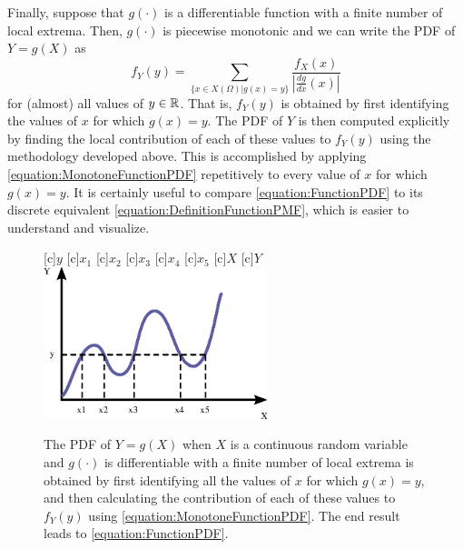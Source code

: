 Finally, suppose that $g(\cdot)$ is a differentiable function with a finite number of local extrema.
Then, $g(\cdot)$ is piecewise monotonic and we can write the PDF of $Y= g(X)$ as
\begin{equation} \label{equation:FunctionPDF}
f_Y (y) = \sum_{ \{ x \in X(\Omega) | g(x) = y \} }
\frac{f_X (x)}{\left| \frac{dg}{dx}(x) \right|}
\end{equation}
for (almost) all values of $y \in \mathbb{R}$.
That is, $f_Y (y)$ is obtained by first identifying the values of $x$ for which $g(x) = y$.
The PDF of $Y$ is then computed explicitly by finding the local contribution of each of these values to $f_Y(y)$ using the methodology developed above.
This is accomplished by applying \eqref{equation:MonotoneFunctionPDF} repetitively to every value of $x$ for which $g(x) = y$.
It is certainly useful to compare \eqref{equation:FunctionPDF} to its discrete equivalent \eqref{equation:DefinitionFunctionPMF}, which is easier to understand and visualize.

\begin{figure}[ht]
\begin{center}
\begin{psfrags}
[c]{$y$}
[c]{$x_1$}
[c]{$x_2$}
[c]{$x_3$}
[c]{$x_4$}
[c]{$x_5$}
[c]{$X$}
[c]{$Y$}
\includegraphics[width=6.5cm]{Figures/9Chapter/DerivedPDF}
\end{psfrags}
\caption{The PDF of $Y = g(X)$ when $X$ is a continuous random variable and $g(\cdot)$ is differentiable with a finite number of local extrema is obtained by first identifying all the values of $x$ for which $g(x) = y$, and then calculating the contribution of each of these values to $f_Y(y)$ using \eqref{equation:MonotoneFunctionPDF}.
The end result leads to \eqref{equation:FunctionPDF}.}
\end{center}
\end{figure}

